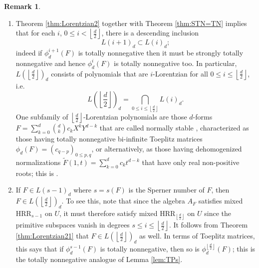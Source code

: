 \documentclass[unnumsec,webpdf,modern,medium]{oup-authoring-template}
\newcommand{\flo}[1]{\left\lfloor\frac{#1}{2}\right\rfloor}
\theoremstyle{theorem}
\theoremstyle{definition}
\newtheorem{remark}[theorem]{Remark}
\begin{document}
\begin{remark}
	\label{rem:Whitney2}
	\begin{enumerate}
		
		
		
		\item 
		Theorem \ref{thm:Lorentzian2} together with Theorem \ref{thm:STN=TN} implies that for each $i$, $0\leq i< \flo{d}$, there is a descending inclusion 
		$$L(i+1)_d\subset L(i)_d;$$
		indeed if $\phi^{i+1}_d(F)$ is totally nonnegative then it must be strongly totally nonnegative and hence $\phi^i_d(F)$ is totally nonnegative too.  In particular, $L\left(\flo{d}\right)_d$ consists of polynomials that are $i$-Lorentzian for all $0\leq i\leq \flo{d}$, i.e.
		$$L\left(\flo{d}\right)_d=\bigcap_{0\leq i\leq \flo{d}}L(i)_d.$$ 
		One subfamily of $\flo{d}$-Lorentzian polynomials are those $d$-forms $F=\sum_{k=0}^d\binom{d}{k}c_kX^kY^{d-k}$ that are called normally stable \cite[Definition 4.25]{MMS}, characterized as those having totally nonnegative bi-infinite Toeplitz matrices $\phi_d(F)=\left(c_{q-p}\right)_{0\leq p,q}$, or alternatively, as those having dehomogenized normalizations $\tilde{F}(1,t)=\sum_{k=0}^dc_kt^{d-k}$ that have only real non-positive roots; this is \cite[Theorem 4 or Theorem 4.30]{MMS}.
		
		\item If $F\in L(s-1)_d$ where $s=s(F)$ is the Sperner number of $F$, then $F\in L\left(\flo{d}\right)_d$.  To see this, note
		that since the algebra $A_F$ satisfies mixed HRR$_{s-1}$ on $U$, it must therefore satisfy mixed HRR$_{\flo{d}}$ on $U$ since the primitive subspaces vanish in degrees $s\leq i\leq \flo{d}$.  It follows from Theorem \ref{thm:Lorentzian21} that $F\in L\left(\flo{d}\right)_d$ as well.  In terms of Toeplitz matrices, this says that if $\phi^{s-1}_d(F)$ is totally nonnegative, then so is $\phi^{\flo{d}}_d(F)$; this is the totally nonnegative analogue of Lemma \ref{lem:TPs}.  
	\end{enumerate}       
\end{remark}
\end{document}
